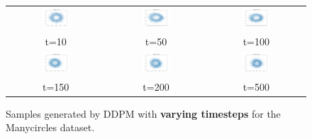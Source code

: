\documentclass[11pt]{article}
\begin{document}
\begin{figure}[ht]
    \centering
    \begin{tabular}{ccc}
        \includegraphics[width=0.3\textwidth]{exps/ddpm_2_10_0.0001_0.02_manycircles/samples_10.png} &
        \includegraphics[width=0.3\textwidth]{exps/ddpm_2_50_0.0001_0.02_manycircles/samples_50.png} &
        \includegraphics[width=0.3\textwidth]{exps/ddpm_2_100_0.0001_0.02_manycircles/samples_100.png} \\
        t=10 & t=50 & t=100 \\[0.5em]
        
        \includegraphics[width=0.3\textwidth]{exps/ddpm_2_150_0.0001_0.02_manycircles/samples_150.png} &
        \includegraphics[width=0.3\textwidth]{exps/ddpm_2_200_0.0001_0.02_manycircles/samples_200.png} &
        \includegraphics[width=0.3\textwidth]{exps/ddpm_2_500_0.0001_0.02_manycircles/samples_500.png} \\
        t=150 & t=200 & t=500 \\
    \end{tabular}
    \caption{Samples generated by DDPM with \textbf{varying timesteps} for the Manycircles dataset.}
    \label{fig:timesteps_manycircles}
\end{figure}
\end{document}
